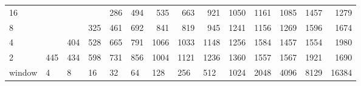 \begin{table}[h]
{\begin{tabular}{lrrrrrrrrrrrrr}
			\multicolumn{1}{|l|}{16} &  &  &  & \cellcolor[HTML]{99E600}286 & \cellcolor[HTML]{99E600}494 & \cellcolor[HTML]{99E600}535 & \cellcolor[HTML]{E69900}663 & \cellcolor[HTML]{E60000}921 & \cellcolor[HTML]{E60000}1050 & \cellcolor[HTML]{E60000}1161 & \cellcolor[HTML]{E60000}1085 & \cellcolor[HTML]{9900E6}1457 & \cellcolor[HTML]{9900E6}1279 \\ \cline{1-1}
			\multicolumn{1}{|l|}{8} &  &  & \cellcolor[HTML]{99E600}325 & \cellcolor[HTML]{99E600}461 & \cellcolor[HTML]{E69900}692 & \cellcolor[HTML]{E69900}841 & \cellcolor[HTML]{E69900}819 & \cellcolor[HTML]{E60000}945 & \cellcolor[HTML]{9900E6}1241 & \cellcolor[HTML]{E60000}1156 & \cellcolor[HTML]{9900E6}1269 & \cellcolor[HTML]{4C00E6}1596 & \cellcolor[HTML]{4C00E6}1674 \\ \cline{1-1}
			\multicolumn{1}{|l|}{4} &  & \cellcolor[HTML]{99E600}404 & \cellcolor[HTML]{99E600}528 & \cellcolor[HTML]{E69900}665 & \cellcolor[HTML]{E69900}791 & \cellcolor[HTML]{E60000}1066 & \cellcolor[HTML]{E60000}1033 & \cellcolor[HTML]{E60000}1148 & \cellcolor[HTML]{9900E6}1256 & \cellcolor[HTML]{4C00E6}1584 & \cellcolor[HTML]{9900E6}1457 & \cellcolor[HTML]{9900E6}1554 & \cellcolor[HTML]{4C00E6}1980 \\ \cline{1-1}
			\multicolumn{1}{|l|}{2} & \cellcolor[HTML]{99E600}445 & \cellcolor[HTML]{99E600}434 & \cellcolor[HTML]{E69900}598 & \cellcolor[HTML]{E69900}731 & \cellcolor[HTML]{E69900}856 & \cellcolor[HTML]{E60000}1004 & \cellcolor[HTML]{E60000}1121 & \cellcolor[HTML]{E60000}1236 & \cellcolor[HTML]{9900E6}1360 & \cellcolor[HTML]{9900E6}1557 & \cellcolor[HTML]{9900E6}1567 & \cellcolor[HTML]{4C00E6}1921 & \cellcolor[HTML]{4C00E6}1690 \\ \hline
			\multicolumn{1}{l|}{window} & \multicolumn{1}{l|}{4} & \multicolumn{1}{l|}{8} & \multicolumn{1}{l|}{16} & \multicolumn{1}{l|}{32} & \multicolumn{1}{l|}{64} & \multicolumn{1}{l|}{128} & \multicolumn{1}{l|}{256} & \multicolumn{1}{l|}{512} & \multicolumn{1}{l|}{1024} & \multicolumn{1}{l|}{2048} & \multicolumn{1}{l|}{4096} & \multicolumn{1}{l|}{8129} & \multicolumn{1}{l|}{16384} \\ \cline{2-14} 
		\end{tabular}
	}
\end{table}

